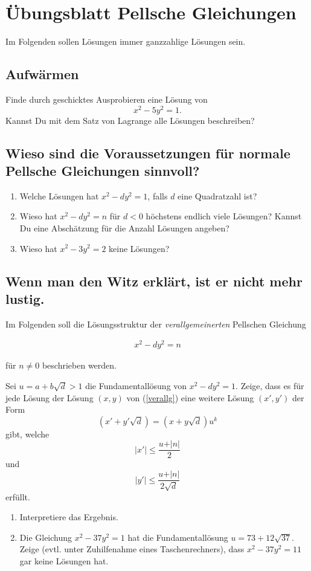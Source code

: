 \documentclass[a4paper,12pt]{article}
\newcounter{task}
\newcommand{\task}{\stepcounter{task}\subsection}
\begin{document}
\section*{Übungsblatt Pellsche Gleichungen}

Im Folgenden sollen Lösungen immer ganzzahlige Lösungen sein.
\task{Aufwärmen}

Finde durch geschicktes Ausprobieren eine Lösung von \[x^2-5y^2=1\text{.}\] Kannst Du mit dem Satz von Lagrange alle Lösungen beschreiben?

\task{Wieso sind die Voraussetzungen für normale Pellsche Gleichungen sinnvoll?}

\begin{enumerate}
    \item Welche Lösungen hat $x^2-dy^2=1$, falls $d$ eine Quadratzahl ist?
    \item Wieso hat $x^2-dy^2=n$ für $d<0$ höchstens endlich viele Lösungen? Kannst Du eine Abschätzung für die Anzahl Lösungen angeben?
    \item Wieso hat $x^2-3y^2=2$ keine Lösungen?
\end{enumerate}

\task{Wenn man den Witz erklärt, ist er nicht mehr lustig.}
Im Folgenden soll die Lösungsstruktur der \emph{verallgemeinerten} Pellschen Gleichung

\begin{align}\label{verallg}
x^2-dy^2=n    
\end{align}

für $n\neq 0$ beschrieben werden.

Sei $u=a+b\sqrt d>1$ die Fundamentallösung von $x^2-dy^2=1$. Zeige, dass es für jede Lösung der Lösung $(x,y)$ von (\ref{verallg}) eine weitere Lösung $(x',y')$ der Form \[
(x'+y'\sqrt{d})=(x+y\sqrt{d})u^k
\] gibt, welche \[\vert x'\vert\leq\frac{u+\vert n\vert}{2}\] und \[\vert y'\vert\leq\frac{u+\vert n\vert}{2\sqrt{d}}\] erfüllt.

\begin{enumerate}
    \item Interpretiere das Ergebnis.
    \item Die Gleichung $x^2-37y^2=1$ hat die Fundamentallösung $u=73+12\sqrt{37}$. Zeige (evtl. unter Zuhilfenahme eines Taschenrechners), dass $x^2-37y^2=11$ gar keine Lösungen hat.
\end{enumerate}
\end{document}
